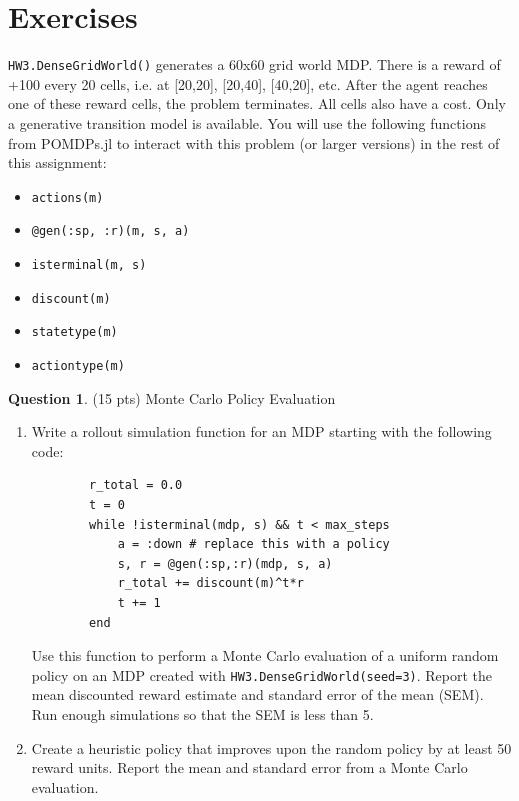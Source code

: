 \documentclass{article}
\theoremstyle{definition}
\newtheorem{question}[thm]{Question}
\begin{document}
\section{Exercises}
    \texttt{HW3.DenseGridWorld()} generates a 60x60 grid world MDP. There is a reward of +100 every 20 cells, i.e. at [20,20], [20,40], [40,20], etc. After the agent reaches one of these reward cells, the problem terminates. All cells also have a cost. Only a generative transition model is available. You will use the following functions from POMDPs.jl to interact with this problem (or larger versions) in the rest of this assignment:
    \begin{itemize}[nosep]
        \item \texttt{actions(m)}
        \item \texttt{@gen(:sp, :r)(m, s, a)}
        \item \texttt{isterminal(m, s)}
        \item \texttt{discount(m)}
        \item \texttt{statetype(m)}
        \item \texttt{actiontype(m)}
    \end{itemize}

\begin{samepage}
\begin{question} (15 pts) Monte Carlo Policy Evaluation
    \begin{enumerate}[label=\alph*)]
        \item Write a rollout simulation function for an MDP starting with the following code:
            \begin{verbatim}
        r_total = 0.0
        t = 0
        while !isterminal(mdp, s) && t < max_steps
            a = :down # replace this with a policy
            s, r = @gen(:sp,:r)(mdp, s, a)
            r_total += discount(m)^t*r
            t += 1
        end
                \end{verbatim} Use this function to perform a Monte Carlo evaluation of a uniform random policy on an MDP created with \texttt{HW3.DenseGridWorld(seed=3)}. Report the mean discounted reward estimate and standard error of the mean (SEM). Run enough simulations so that the SEM is less than 5.
         \item Create a heuristic policy that improves upon the random policy by at least 50 reward units. Report the mean and standard error from a Monte Carlo evaluation.
    \end{enumerate}
\end{question}
\end{samepage}
\end{document}
